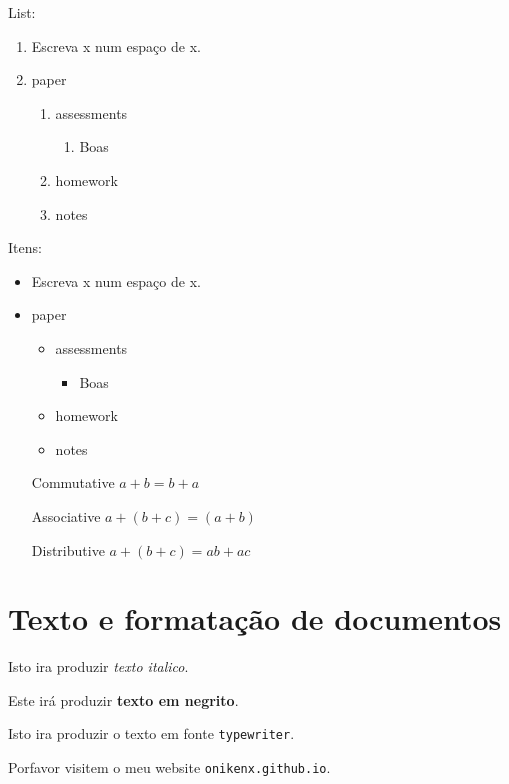 \documentclass[a4paper,10pt]{article}
\begin{document}
 List:
 \begin{enumerate}
  \item Escreva x num espaço de x.
  \item paper
  \begin{enumerate}
   \item assessments
   \begin {enumerate}
   \item Boas
   \end {enumerate}
   \item homework
   \item notes
  \end{enumerate}
 \end{enumerate}  

 Itens:
 \begin{itemize}
  \item Escreva x num espaço de x.
  \item paper
  \begin{itemize}
   \item assessments
   \begin {itemize}
   \item Boas
   \end {itemize}
   \item homework
   \item notes
  \end{itemize}
 \end{itemize}  

 \begin{enumerate}
  \item[Commutative]$a+b=b+a$
  \item[Associative]$a+(b+c)=(a+b)$
  \item[Distributive]$a+(b+c)=ab+ac$
  
 \end{enumerate}
 
 \newpage
\section{Texto e formatação de documentos}
Isto ira produzir \textit{texto italico}.


Este irá produzir \textbf{texto em negrito}.

Isto ira produzir o texto em fonte \texttt{typewriter}.


Porfavor visitem o meu website \texttt{onikenx.github.io}.
\end{document}

